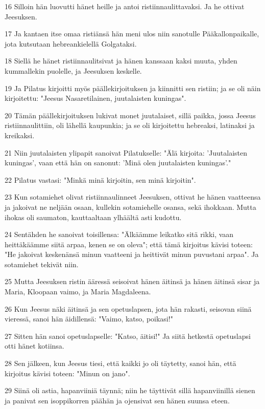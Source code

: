\par 16 Silloin hän luovutti hänet heille ja antoi ristiinnaulittavaksi. Ja he ottivat Jeesuksen.
\par 17 Ja kantaen itse omaa ristiänsä hän meni ulos niin sanotulle Pääkallonpaikalle, jota kutsutaan hebreankielellä Golgataksi.
\par 18 Siellä he hänet ristiinnaulitsivat ja hänen kanssaan kaksi muuta, yhden kummallekin puolelle, ja Jeesuksen keskelle.
\par 19 Ja Pilatus kirjoitti myös päällekirjoituksen ja kiinnitti sen ristiin; ja se oli näin kirjoitettu: "Jeesus Nasaretilainen, juutalaisten kuningas".
\par 20 Tämän päällekirjoituksen lukivat monet juutalaiset, sillä paikka, jossa Jeesus ristiinnaulittiin, oli lähellä kaupunkia; ja se oli kirjoitettu hebreaksi, latinaksi ja kreikaksi.
\par 21 Niin juutalaisten ylipapit sanoivat Pilatukselle: "Älä kirjoita: 'Juutalaisten kuningas', vaan että hän on sanonut: 'Minä olen juutalaisten kuningas'."
\par 22 Pilatus vastasi: "Minkä minä kirjoitin, sen minä kirjoitin".
\par 23 Kun sotamiehet olivat ristiinnaulinneet Jeesuksen, ottivat he hänen vaatteensa ja jakoivat ne neljään osaan, kullekin sotamiehelle osansa, sekä ihokkaan. Mutta ihokas oli saumaton, kauttaaltaan ylhäältä asti kudottu.
\par 24 Sentähden he sanoivat toisillensa: "Älkäämme leikatko sitä rikki, vaan heittäkäämme siitä arpaa, kenen se on oleva"; että tämä kirjoitus kävisi toteen: "He jakoivat keskenänsä minun vaatteeni ja heittivät minun puvustani arpaa". Ja sotamiehet tekivät niin.
\par 25 Mutta Jeesuksen ristin ääressä seisoivat hänen äitinsä ja hänen äitinsä sisar ja Maria, Kloopaan vaimo, ja Maria Magdaleena.
\par 26 Kun Jeesus näki äitinsä ja sen opetuslapsen, jota hän rakasti, seisovan siinä vieressä, sanoi hän äidillensä: "Vaimo, katso, poikasi!"
\par 27 Sitten hän sanoi opetuslapselle: "Katso, äitisi!" Ja siitä hetkestä opetuslapsi otti hänet kotiinsa.
\par 28 Sen jälkeen, kun Jeesus tiesi, että kaikki jo oli täytetty, sanoi hän, että kirjoitus kävisi toteen: "Minun on jano".
\par 29 Siinä oli astia, hapanviiniä täynnä; niin he täyttivät sillä hapanviinillä sienen ja panivat sen isoppikorren päähän ja ojensivat sen hänen suunsa eteen.
